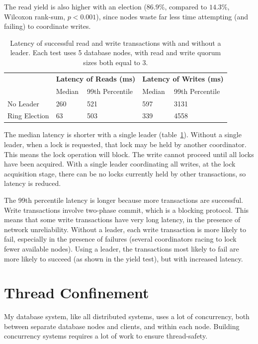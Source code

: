 \documentclass[12pt,a4paper,twoside,openany]{report}
\begin{document}
The read yield is also higher with an election ($86.9\%$, compared to $14.3\%$, Wilcoxon rank-sum, $p < 0.001$), since nodes waste far less time attempting (and failing) to coordinate writes.

\begin{table}[ht!]
\centering
\renewcommand{\arraystretch}{1.3}
\begin{tabular}{@{} l l l l l @{}}
\toprule
& \multicolumn{2}{c}{\bf Latency of Reads (ms)} & \multicolumn{2}{c}{\bf Latency of Writes (ms)} \\
\cmidrule(lr){2-3}
\cmidrule(lr){4-5}
& Median & 99th Percentile & Median & 99th Percentile \\
\hline
No Leader & 260 & 521 & 597 & 3131 \\
Ring Election & 63 & 503 & 339 & 4558 \\
\bottomrule
\end{tabular}
\caption[Latency in tests comparing my system with and without a leadership election]{Latency of successful read and write transactions with and without a leader. Each test uses 5 database nodes, with read and write quorum sizes both equal to 3.}
\label{electorlatency}
\end{table}

The median latency is shorter with a single leader (table~\ref{electorlatency}). Without a single leader, when a lock is requested, that lock may be held by another coordinator. This means the lock operation will block. The write cannot proceed until all locks have been acquired. With a single leader coordinating all writes, at the lock acquisition stage, there can be no locks currently held by other transactions, so latency is reduced.

The 99th percentile latency is longer because more transactions are successful. Write transactions involve two-phase commit, which is a blocking protocol. This means that some write transactions have very long latency, in the presence of network unreliability. Without a leader, each write transaction is more likely to fail, especially in the presence of failures (several coordinators racing to lock fewer available nodes). Using a leader, the transactions most likely to fail are more likely to succeed (as shown in the yield test), but with increased latency. 
\section{Thread Confinement}

My database system, like all distributed systems, uses a lot of concurrency, both between separate database nodes and clients, and within each node. Building concurrency systems requires a lot of work to ensure thread-safety.
\end{document}
